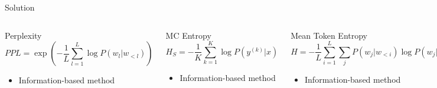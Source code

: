 \documentclass{beamer}
\begin{document}
\begin{frame}{Solution}
\begin{columns}[T]
\begin{block}{Perplexity}
\footnotesize
\begin{equation*}
PPL = \exp\left(-\frac{1}{L}\sum_{l=1}^L \log P(w_l|w_{<l})\right)
\end{equation*}
\vspace{-3mm}
\begin{itemize}
\item Information-based method
\end{itemize}
\end{block}

\begin{block}{MC Entropy}
\footnotesize
\begin{equation*}
H_S = -\frac{1}{K}\sum_{k=1}^K \log P(y^{(k)}|x)
\end{equation*}
\vspace{-3mm}
\begin{itemize}
\item Information-based method
\end{itemize}
\end{block}

\begin{block}{Mean Token Entropy}
\footnotesize
\begin{equation*}
H = -\frac{1}{L}\sum_{i=1}^L \sum_j P(w_j|w_{<i})\log P(w_j|w_{<i})
\end{equation*}
\vspace{-3mm}
\begin{itemize}
\item Information-based method
\end{itemize}
\end{block}

\begin{block}{Mahalanobis distance}
\footnotesize
\begin{equation*}
MD = \sqrt{(h-\mu)^T\Sigma^{-1}(h-\mu)}
\end{equation*}
\vspace{-3mm}
\begin{itemize}
\item Dencity-based method
\item  Method fits a Gaussian centered at the training data centroid µ with an empirical covariance $\Sigma$ matrix 
\end{itemize}
\end{block}
\end{columns}

\end{frame}
\end{document}
